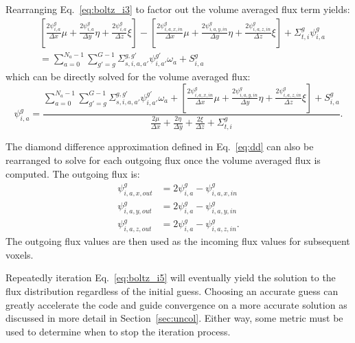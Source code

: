 Rearranging Eq.~\ref{eq:boltz_i3} to factor out the volume averaged flux term yields:
\begin{equation} \label{eq:boltz_i4}
\begin{split}
&\left[ 
\frac{2\psi_{i,a}^{g}}{\Delta x} \mu + 
\frac{2\psi_{i,a}^{g}}{\Delta y} \eta + 
\frac{2\psi_{i,a}^{g}}{\Delta z} \xi
\right] - 
\left[ 
\frac{2\psi_{i,a,x,in}^g}{\Delta x} \mu + 
\frac{2\psi_{i,a,y,in}^g}{\Delta y} \eta + 
\frac{2\psi_{i,a,z,in}^g}{\Delta z} \xi
\right]
+ \Sigma_{t,i}^g \psi_{i,a}^{g} \\
& = 
\sum_{a=0}^{N_a-1} \sum_{g'=g}^{G-1} \Sigma_{s, i, a, a'}^{g, g'} \psi_{i, a'}^{g'} \omega_a + S_{i,a}^g
\end{split}
\end{equation}
which can be directly solved for the volume averaged flux:
\begin{equation} \label{eq:boltz_i5}
\psi_{i,a}^{g} = 
\frac{
  \sum_{a=0}^{N_a-1} \sum_{g'=g}^{G-1} \Sigma_{s, i, a, a'}^{g, g'} \psi_{i,     a'}^{g'} \omega_a + 
  \left[ 
    \frac{2\psi_{i,a,x,in}^g}{\Delta x} \mu + 
    \frac{2\psi_{i,a,y,in}^g}{\Delta y} \eta + 
    \frac{2\psi_{i,a,z,in}^g}{\Delta z} \xi
  \right] + S_{i,a}^g
}{
  \frac{2\mu}{\Delta x}  + 
  \frac{2\eta}{\Delta y} + 
  \frac{2\xi}{\Delta z} + 
  \Sigma_{t,i}^g
}.
\end{equation}

The diamond difference approximation defined in Eq.~\ref{eq:dd} can also be rearranged to solve for each outgoing flux once the volume averaged flux is computed. The outgoing flux is:
\begin{equation} \label{eq:dd3}
\begin{split}
\psi_{i,a,x,out}^g &= 2\psi_{i,a}^{g} - \psi_{i,a,x,in}^g \\
\psi_{i,a,y,out}^g &= 2\psi_{i,a}^{g} - \psi_{i,a,y,in}^g \\
\psi_{i,a,z,out}^g &= 2\psi_{i,a}^{g} - \psi_{i,a,z,in}^g.
\end{split}
\end{equation}
The outgoing flux values are then used as the incoming flux values for subsequent voxels.

Repeatedly iteration Eq.~\ref{eq:boltz_i5} will eventually yield the solution to the flux distribution regardless of the initial guess. Choosing an accurate guess can greatly accelerate the code and guide convergence on a more accurate solution as discussed in more detail in Section~\ref{sec:uncol}. Either way, some metric must be used to determine when to stop the iteration process.

